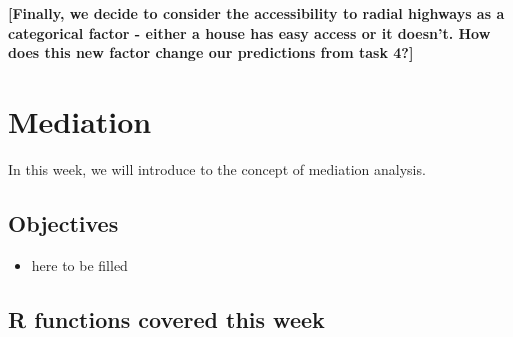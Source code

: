 \documentclass[
]{book}
\providecommand{\tightlist}{%
  \setlength{\itemsep}{0pt}\setlength{\parskip}{0pt}}
\begin{document}
\textbf{{[}Finally, we decide to consider the accessibility to radial highways as a categorical factor - either a house has easy access or it doesn't. How does this new factor change our predictions from task 4?{]}}

\hypertarget{med}{%
\chapter{Mediation}\label{med}}

In this week, we will introduce to the concept of mediation analysis.

\hypertarget{objectives-6}{%
\section{Objectives}\label{objectives-6}}

\begin{itemize}
\tightlist
\item
  here to be filled
\end{itemize}

\hypertarget{r-functions-covered-this-week-2}{%
\section{R functions covered this week}\label{r-functions-covered-this-week-2}}
\end{document}
